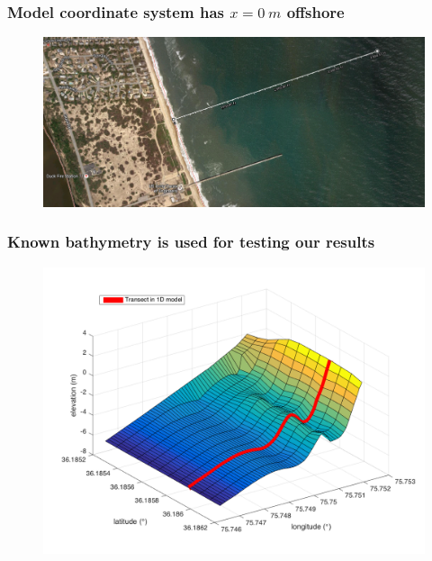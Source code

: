 \documentclass[7pt]{beamer}
\begin{document}
\begin{frame}
	\frametitle{Model coordinate system has $x = 0~m$ offshore}
		\begin{figure}[H]
			\centering
			\includegraphics[width=1\linewidth]{img/Transect.png}
		\end{figure}
\end{frame}

\begin{frame}
	\frametitle{Known bathymetry is used for testing our results}
			\begin{figure}[H]
	 			\includegraphics[width=1\linewidth]{img/trueBath2D.png}
	 		\end{figure}
\end{frame}
\end{document}
